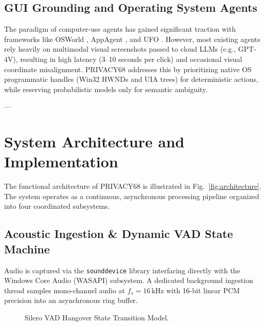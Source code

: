 \documentclass[conference]{IEEEtran}
\begin{document}
\subsection{GUI Grounding and Operating System Agents}
The paradigm of computer-use agents has gained significant traction with frameworks like OSWorld \cite{xie2024osworld}, AppAgent \cite{zhang2023appagent}, and UFO \cite{zhang2024ufo}. However, most existing agents rely heavily on multimodal visual screenshots passed to cloud LLMs (e.g., GPT-4V), resulting in high latency (3--10 seconds per click) and occasional visual coordinate misalignment. PRIVACY68 addresses this by prioritizing native OS programmatic handles (Win32 HWNDs and UIA trees) for deterministic actions, while reserving probabilistic models only for semantic ambiguity.

---

\section{System Architecture and Implementation}
The functional architecture of PRIVACY68 is illustrated in Fig.~\ref{fig:architecture}. The system operates as a continuous, asynchronous processing pipeline organized into four coordinated subsystems.

\subsection{Acoustic Ingestion & Dynamic VAD State Machine}
Audio is captured via the \texttt{sounddevice} library interfacing directly with the Windows Core Audio (WASAPI) subsystem. A dedicated background ingestion thread samples mono-channel audio at $f_s = 16\,\text{kHz}$ with 16-bit linear PCM precision into an asynchronous ring buffer.

\begin{figure}[htbp]
\centering
{}
\caption{Silero VAD Hangover State Transition Model.}
\label{fig:vad_state}
\end{figure}
\end{document}
